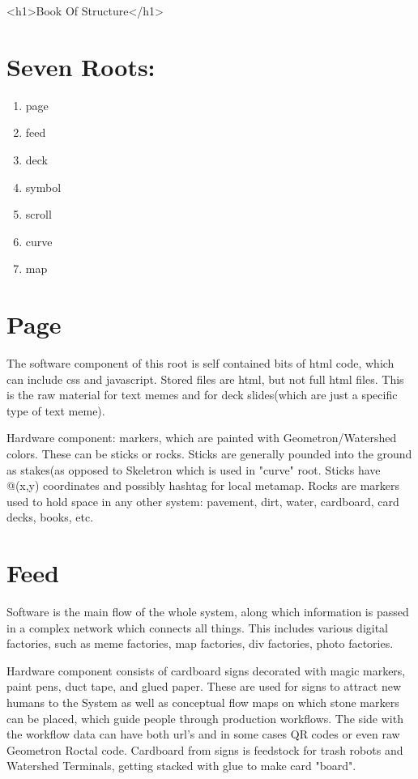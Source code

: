 \documentclass[11pt]{article}
\begin{document}
<h1>Book Of Structure</h1>


\section{
Seven Roots:}
\begin{enumerate}

    \item
page
    \item
feed
    \item
deck
    \item
symbol
    \item
scroll
    \item
curve
    \item
map
\end{enumerate}


\section{
Page}




The software component of this root is self contained bits of html code, which can include css and javascript.  Stored files are html, but not full html files.  This is the raw material for text memes and for deck slides(which are just a specific type of text meme).     






    Hardware component: markers, which are painted with Geometron/Watershed colors. These can be sticks or rocks.  Sticks are generally pounded into the ground as stakes(as opposed to Skeletron which is used in "curve" root.  Sticks have @(x,y) coordinates and possibly hashtag for local metamap.  Rocks are markers used to hold space in any other system: pavement, dirt, water, cardboard, card decks, books, etc.



\section{
Feed}




    Software is the main flow of the whole system, along which information is passed in a complex network which connects all things.  This includes various digital factories, such as meme factories, map factories, div factories, photo factories.  




    Hardware component consists of cardboard signs decorated with magic markers, paint pens, duct tape, and glued paper.  These are used for signs to attract new humans to the System as well as conceptual flow maps on which stone markers can be placed, which guide people through production workflows.  The side with the workflow data can have both url's and in some cases QR codes or even raw Geometron Roctal code.  Cardboard from signs is feedstock for trash robots and Watershed Terminals, getting stacked with glue to make card "board".
\end{document}
